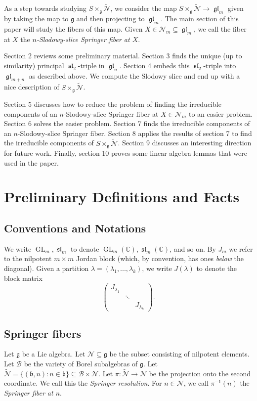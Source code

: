 \documentclass[12pt,psamsfonts]{article}
\DeclareMathOperator{\GL}{GL}
\DeclareMathOperator{\gl}{\mathfrak{gl}}
\DeclareMathOperator{\spl}{\mathfrak{sl}}
\begin{document}
As a step towards studying \(S \times_\mathfrak{g} \widetilde{\mathcal{N}}\), we consider the map \(S \times_\mathfrak{g} \widetilde{\mathcal{N}} \to \gl_m\) given by taking the map to \(\mathfrak{g}\) and then projecting to \(\gl_m\).
The main section of this paper will study the fibers of this map.
Given \(X \in \mathcal{N}_m \subseteq \gl_m\), we call the fiber at \(X\) the \emph{\(n\)-Slodowy-slice Springer fiber at \(X\)}.
\par Section 2 reviews some preliminary material.
Section 3 finds the unique (up to similarity) principal \(\spl_2\)-triple in \(\gl_n\).
Section 4 embeds this \(\spl_2\)-triple into \(\gl_{m + n}\) as described above.
We compute the Slodowy slice and end up with a nice description of \(S \times_\mathfrak{g} \widetilde{\mathcal{N}}\).
\par Section 5 discusses how to reduce the problem of finding the irreducible components of an \(n\)-Slodowy-slice Springer fiber at \(X \in \mathcal{N}_m\) to an easier problem.
Section 6 solves the easier problem.
Section 7 finds the irreducible components of an \(n\)-Slodowy-slice Springer fiber.
Section 8 applies the results of section 7 to find the irreducible components of \(S \times_\mathfrak{g} \widetilde{\mathcal{N}}\).
Section 9 discusses an interesting direction for future work.
Finally, section 10 proves some linear algebra lemmas that were used in the paper.

\section{Preliminary Definitions and Facts}
\subsection{Conventions and Notations}
We write \(\GL_m, \spl_m\) to denote \(\GL_m(\mathbb{C}), \spl_m(\mathbb{C})\), and so on.
By \(J_m\) we refer to the nilpotent \(m \times m\) Jordan block (which, by convention, has ones \emph{below} the diagonal).
Given a partition \(\lambda = (\lambda_1, ..., \lambda_k)\), we write \(J(\lambda)\) to denote the block matrix
\[\begin{pmatrix}
    J_{\lambda_1} \\
    & \ddots \\
    & & J_{\lambda_k}
\end{pmatrix}.\]

\subsection{Springer fibers}
Let \(\mathfrak{g}\) be a Lie algebra.
Let \(\mathcal{N} \subseteq \mathfrak{g}\) be the subset consisting of nilpotent elements.
Let \(\mathcal{B}\) be the variety of Borel subalgebras of \(\mathfrak{g}\).
Let \(\widetilde{\mathcal{N}} = \{(\mathfrak{b}, n) : n \in \mathfrak{b}\} \subseteq \mathcal{B} \times \mathcal{N}\).
Let \(\pi : \widetilde{\mathcal{N}} \to \mathcal{N}\) be the projection onto the second coordinate.
We call this the \emph{Springer resolution}.
For \(n \in \mathcal{N}\), we call \(\pi^{-1}(n)\) the \emph{Springer fiber at \(n\)}.
\end{document}
